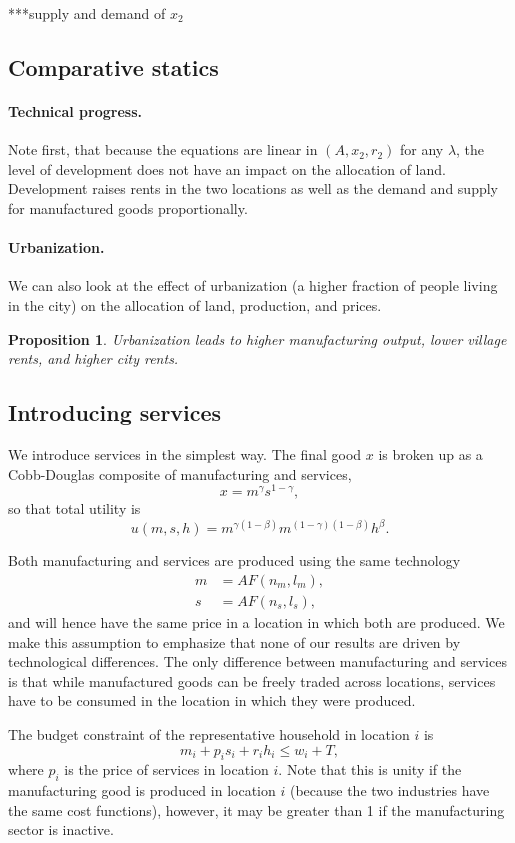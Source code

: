 \documentclass[12pt]{article}
\newtheorem{proposition}{Proposition}
\begin{document}
***supply and demand of $x_2$

\subsection{Comparative statics}
\paragraph{Technical progress.}
Note first, that because the equations are linear in $(A,x_2,r_2)$ for any ${\lambda}$, the level of development does not have an impact on the allocation of land. Development raises rents in the two locations as well as the demand and supply for manufactured goods proportionally.

\paragraph{Urbanization.}
We can also look at the effect of urbanization (a higher fraction of people living in the city) on the allocation of land, production, and prices.

\begin{proposition}
Urbanization leads to higher manufacturing output, lower village rents, and higher city rents.
\end{proposition}

\subsection{Introducing services}
We introduce services in the simplest way. The final good $x$ is broken up as a Cobb-Douglas composite of manufacturing and services,
\[
x = m^\gamma s^{1-\gamma},
\]
so that total utility is
\[
u(m,s,h) = m^{\gamma(1-\beta)}m^{(1-\gamma)(1-\beta)}h^\beta.
\]

Both manufacturing and services are produced using the same technology
\begin{align*}
m&=AF(n_m,l_m),\\
s&=AF(n_s,l_s),
\end{align*}
and will hence have the same price in a location in which both are produced. We make this assumption to emphasize that none of our results are driven by technological differences. The only difference between manufacturing and services is that while manufactured goods can be freely traded across locations, services have to be consumed in the location in which they were produced.

The budget constraint of the representative household in location $i$ is
\[
m_i + p_is_i + r_i h_i \le w_i + T,
\]
where $p_i$ is the price of services in location $i$. Note that this is unity if the manufacturing good is produced in location $i$ (because the two industries have the same cost functions), however, it may be greater than 1 if the manufacturing sector is inactive.
\end{document}
